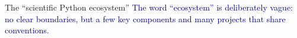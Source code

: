 \documentclass[aspectratio=169]{beamer}
\begin{document}
\begin{frame}{The ``scientific Python ecosystem''}
\vspace{0.35 cm}
\textcolor{darkblue}{The word ``ecosystem'' is deliberately vague: no clear boundaries, but a few key components and many projects that share conventions.}

\begin{columns}

\end{columns}
\end{frame}
\end{document}
